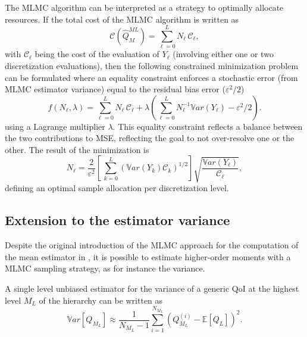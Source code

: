The MLMC algorithm can be interpreted as a strategy to optimally allocate 
resources. If the total cost of the MLMC algorithm is written as  
\begin{equation}\label{EQ: MLMC cost}
\mathcal{C}(\hat{Q}^{ML}_{M}) = \sum_{\ell=0}^{L} N_\ell \, \mathcal{C}_{\ell},
\end{equation}
with $\mathcal{C}_{\ell}$ being the cost of the evaluation of $Y_\ell$ (involving either one or two discretization evaluations), then the following constrained minimization problem can be formulated where an equality constraint enforces a stochastic error (from MLMC estimator variance) equal to the residual bias error ($\varepsilon^2/2$)
\begin{equation}\label{EQ:mlmc_optimization}
 f(N_\ell,\lambda) = \sum_{\ell=0}^{L} N_\ell \, \mathcal{C}_{\ell} 
                   + \lambda \left( \sum_{\ell=0}^{L} N_\ell^{-1} \mathbb{V}ar\left({Y_\ell}\right) - \varepsilon^2/2 \right). 
\end{equation}
using a Lagrange multiplier $\lambda$.  This equality constraint reflects a balance between the two contributions to MSE, reflecting the goal to not over-resolve one or the other.  The result of the minimization is
\begin{equation}\label{EQ: MLMC nl}
N_{\ell} = \frac{2}{\varepsilon^2} \left[ \, \sum_{k=0}^L \left( \mathbb{V}ar\left(Y_k\right) \mathcal{C}_k \right)^{1/2} \right] 
               \sqrt{\frac{ \mathbb{V}ar\left({Y_\ell}\right) }{\mathcal{C}_{\ell}}},
\end{equation}
defining an optimal sample allocation per discretization level.

\subsection{Extension to the estimator variance}
Despite the original introduction of the MLMC approach for the computation of the mean estimator in \cite{Giles2008,Giles2015}, it is 
possible to estimate higher-order moments with a MLMC sampling strategy, as for instance the variance.

A single level unbiased estimator for the variance of a generic QoI at the highest level $M_L$ of the hierarchy can be written as
\begin{equation}
\label{eq: variance_est_single_level}
 \mathbb{V}ar\left[Q_{M_L}\right] \approx \frac{1}{N_{M_L} - 1} \sum_{i=1}^{N_{M_L}} \left( Q_{M_L}^{(i)} - \mathbb{E}\left[Q_L\right] \right)^2.
\end{equation}

